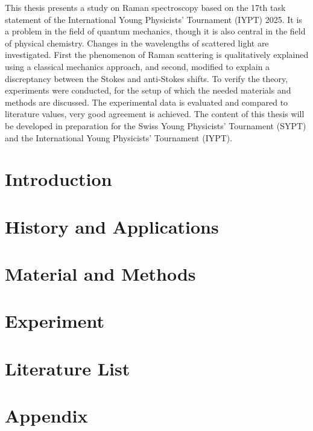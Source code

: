 \documentclass[a4paper]{article}
\begin{document}
This thesis presents a study on Raman spectroscopy based on the 17th task statement of the International Young Physicists' Tournament (IYPT) 2025. It is a problem in the field of quantum mechanics, though it is also central in the field of physical chemistry. Changes in the wavelengths of scattered light are investigated. First the phenomenon of Raman scattering is qualitatively explained using a classical mechanics approach, and second, modified to explain a discreptancy between the Stokes and anti-Stokes shifts. To verify the theory, experiments were conducted, for the setup of which the needed materials and methods are discussed. The experimental data is evaluated and compared to literature values, very good agreement is achieved. The content of this thesis will be developed in preparation for the Swiss Young Physicists' Tournament (SYPT) and the International Young Physicists' Tournament (IYPT).

\newpage

\tableofcontents
\newpage

\section{Introduction}

\newpage

\section{History and Applications}

\newpage


\newpage

\section{Material and Methods}\label{mat_met}

\newpage

\section{Experiment}


\newpage


\newpage

\section*{Literature List}
\printbibliography

\newpage

\section{Appendix}

\end{document}
